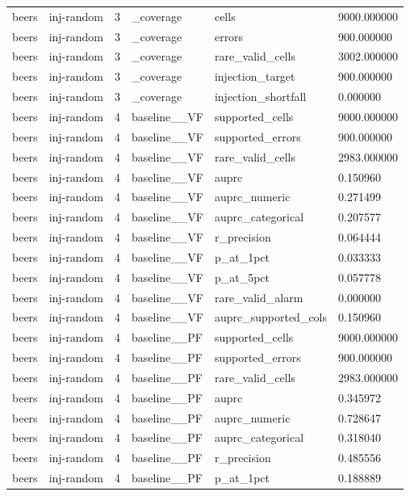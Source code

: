 \begin{tabular}{llllll}
beers & inj-random & 3 & \_coverage & cells & 9000.000000 \\
beers & inj-random & 3 & \_coverage & errors & 900.000000 \\
beers & inj-random & 3 & \_coverage & rare\_valid\_cells & 3002.000000 \\
beers & inj-random & 3 & \_coverage & injection\_target & 900.000000 \\
beers & inj-random & 3 & \_coverage & injection\_shortfall & 0.000000 \\
beers & inj-random & 4 & baseline\_\_VF & supported\_cells & 9000.000000 \\
beers & inj-random & 4 & baseline\_\_VF & supported\_errors & 900.000000 \\
beers & inj-random & 4 & baseline\_\_VF & rare\_valid\_cells & 2983.000000 \\
beers & inj-random & 4 & baseline\_\_VF & auprc & 0.150960 \\
beers & inj-random & 4 & baseline\_\_VF & auprc\_numeric & 0.271499 \\
beers & inj-random & 4 & baseline\_\_VF & auprc\_categorical & 0.207577 \\
beers & inj-random & 4 & baseline\_\_VF & r\_precision & 0.064444 \\
beers & inj-random & 4 & baseline\_\_VF & p\_at\_1pct & 0.033333 \\
beers & inj-random & 4 & baseline\_\_VF & p\_at\_5pct & 0.057778 \\
beers & inj-random & 4 & baseline\_\_VF & rare\_valid\_alarm & 0.000000 \\
beers & inj-random & 4 & baseline\_\_VF & auprc\_supported\_cols & 0.150960 \\
beers & inj-random & 4 & baseline\_\_PF & supported\_cells & 9000.000000 \\
beers & inj-random & 4 & baseline\_\_PF & supported\_errors & 900.000000 \\
beers & inj-random & 4 & baseline\_\_PF & rare\_valid\_cells & 2983.000000 \\
beers & inj-random & 4 & baseline\_\_PF & auprc & 0.345972 \\
beers & inj-random & 4 & baseline\_\_PF & auprc\_numeric & 0.728647 \\
beers & inj-random & 4 & baseline\_\_PF & auprc\_categorical & 0.318040 \\
beers & inj-random & 4 & baseline\_\_PF & r\_precision & 0.485556 \\
beers & inj-random & 4 & baseline\_\_PF & p\_at\_1pct & 0.188889 \\

\end{tabular}
